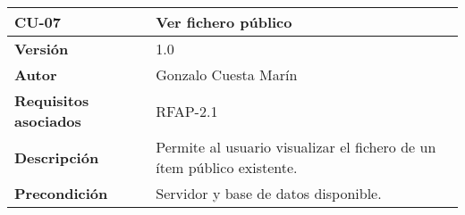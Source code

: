 \begin{longtable}[]{@{}ll@{}}
\toprule
\begin{minipage}[b]{0.23\columnwidth}\raggedright
\textbf{CU-07}\strut
\end{minipage} & \begin{minipage}[b]{0.71\columnwidth}\raggedright
\textbf{Ver fichero público}\strut
\end{minipage}\tabularnewline
\midrule
\endhead
\begin{minipage}[t]{0.23\columnwidth}\raggedright
\textbf{Versión}\strut
\end{minipage} & \begin{minipage}[t]{0.71\columnwidth}\raggedright
1.0\strut
\end{minipage}\tabularnewline
\begin{minipage}[t]{0.23\columnwidth}\raggedright
\textbf{Autor}\strut
\end{minipage} & \begin{minipage}[t]{0.71\columnwidth}\raggedright
Gonzalo Cuesta Marín\strut
\end{minipage}\tabularnewline
\begin{minipage}[t]{0.23\columnwidth}\raggedright
\textbf{Requisitos asociados}\strut
\end{minipage} & \begin{minipage}[t]{0.71\columnwidth}\raggedright
RFAP-2.1\strut
\end{minipage}\tabularnewline
\begin{minipage}[t]{0.23\columnwidth}\raggedright
\textbf{Descripción}\strut
\end{minipage} & \begin{minipage}[t]{0.71\columnwidth}\raggedright
Permite al usuario visualizar el fichero de un ítem público
existente.\strut
\end{minipage}\tabularnewline
\begin{minipage}[t]{0.23\columnwidth}\raggedright
\textbf{Precondición}\strut
\end{minipage} & \begin{minipage}[t]{0.71\columnwidth}\raggedright
Servidor y base de datos disponible.


\end{minipage}
\end{longtable}
